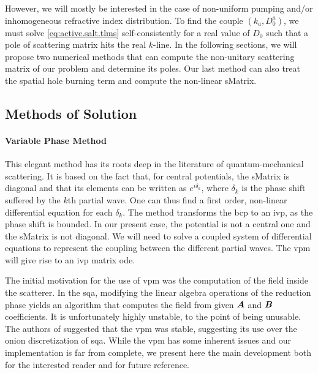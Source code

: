 However, we will mostly be interested in the case of non-uniform pumping
and/or inhomogeneous refractive index distribution. To find the couple
$(k_a,D_0^a)$, we must solve \eqref{eq:active.salt.tlms} self-consistently
for a real value of $D_0$ such that a pole of scattering matrix hits 
the real $k$-line. In the following sections, we will propose two
numerical methods that can compute the non-unitary scattering matrix
of our problem and determine its poles. Our last method can also 
treat the spatial hole burning term and compute the non-linear 
\gls{sMatrix}.

\subsection{Methods of Solution}
\paragraph{Variable Phase Method}
This elegant method has its roots deep in the literature of quantum-mechanical
scattering. It is based on the fact that, for central potentials, the 
\gls{sMatrix} is diagonal and that its elements can be written as
$e^{i\delta_k}$, where $\delta_k$ is the phase shift suffered by the 
$k$th partial wave. One can thus find a first order, non-linear differential
equation \cite{CAL1967} for each $\delta_k$. The method transforms the \gls{bcp} to an \gls{ivp}, as the phase shift
is bounded. In our present case, the potential is not a central one and the
\gls{sMatrix} is not diagonal. We will need to solve a coupled system 
of differential equations to represent the coupling between the different
partial waves. The \gls{vpm} will give rise to an \gls{ivp} matrix \gls{ode}.

The initial motivation for the use of \gls{vpm} was the computation 
of the field inside the scatterer. In the \gls{sqa}, modifying 
the linear algebra operations of the reduction phase yields
an algorithm that computes the field from given $\boldsymbol{A}$ and $\boldsymbol{B}$
coefficients. It is unfortunately highly unstable, to the point 
of being unusable. The authors of \cite{FOR2012} suggested that
the \gls{vpm} was stable, suggesting its use over the onion
discretization of \gls{sqa}. While the \gls{vpm} has some inherent
issues and our implementation is far from complete, we present
here the main development both for the interested reader and for 
future reference. 

